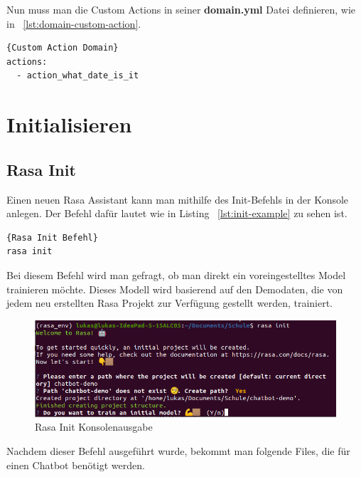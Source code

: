 Nun muss man die Custom Actions in seiner \textbf{domain.yml} Datei definieren, wie in ~\ref{lst:domain-custom-action}.

\begin{lstlisting}[label={lst:domain-custom-action},caption={Custom Actions in Domain definiert}]{Custom Action Domain}
actions:
  - action_what_date_is_it
\end{lstlisting}

\section{Initialisieren}

\subsection{Rasa Init}

Einen neuen Rasa Assistant kann man mithilfe des Init-Befehls in der Konsole anlegen.
Der Befehl dafür lautet wie in Listing ~\ref{lst:init-example} zu sehen ist.

\begin{lstlisting}[language=bash,label={lst:init-example},caption={Befehl fürs Initialisieren}]{Rasa Init Befehl}
rasa init
\end{lstlisting}

Bei diesem Befehl wird man gefragt, ob man direkt ein voreingestelltes Model trainieren möchte.
Dieses Modell wird basierend auf den Demodaten, die von jedem neu erstellten Rasa Projekt zur Verfügung gestellt werden, trainiert.

\begin{figure}[hbt!]
    \centering
    \includegraphics[scale=0.5]{pics/rasa_init}
    \caption{Rasa Init Konsolenausgabe}
    \label{fig:rasa_init}
\end{figure}

Nachdem dieser Befehl ausgeführt wurde, bekommt man folgende Files, die für einen Chatbot benötigt werden.

